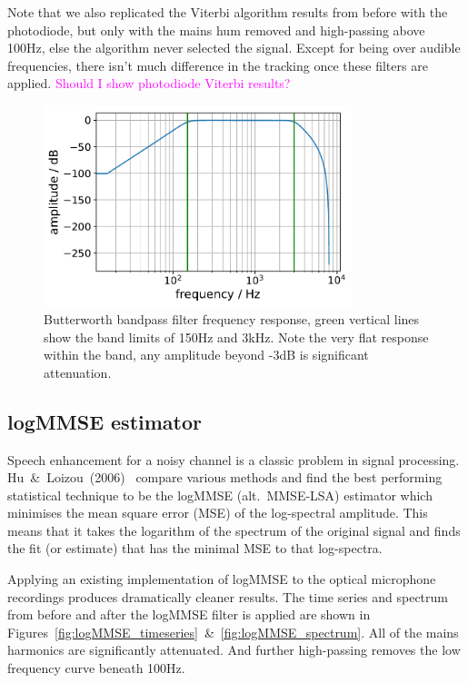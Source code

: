 \documentclass[prb,preprint]{revtex4-1}
\newcommand{\jam}{\textcolor{magenta}}
\begin{document}
Note that we also replicated the Viterbi algorithm results from before with the photodiode, but only with the mains hum removed and high-passing above 100Hz, else the algorithm never selected the signal. Except for being over audible frequencies, there isn’t much difference in the tracking once these filters are applied. \jam{Should I show photodiode Viterbi results?}

\begin{figure}%
	\includegraphics[width=0.8\textwidth]{figures/butterworth_150_3000-cropped.pdf}
	\caption{Butterworth bandpass filter frequency response, green vertical lines show the band limits of 150Hz and 3kHz. Note the very flat response within the band, any amplitude beyond -3dB is significant attenuation.}
	\label{fig:butterworth}
\end{figure}

\subsection{logMMSE estimator}

Speech enhancement for a noisy channel is a classic problem in signal processing. Hu~\&~Loizou~(2006)~\cite{SubjectiveComparison} compare various methods and find the best performing statistical technique to be the logMMSE (alt.\ MMSE-LSA) estimator which minimises the mean square error (MSE) of the log-spectral amplitude. This means that it takes the logarithm of the spectrum of the original signal and finds the fit (or estimate) that has the minimal MSE to that log-spectra.


Applying an existing implementation of logMMSE\cite{logmmse} to the optical microphone recordings produces dramatically cleaner results. The time series and spectrum from before and after the logMMSE filter is applied are shown in Figures~\ref{fig:logMMSE_timeseries}~\&~\ref{fig:logMMSE_spectrum}. All of the mains harmonics are significantly attenuated. And further high-passing removes the low frequency curve beneath 100Hz.
\end{document}
